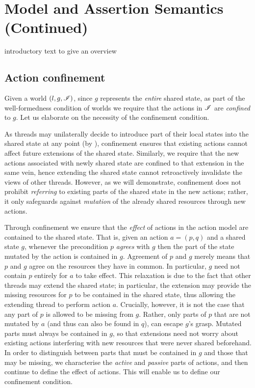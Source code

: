 \section{\colosl Model and Assertion Semantics (Continued)}\label{chapter:logic}
\todo introductory text to give an overview
%
%
\subsection{Action confinement}
Given a world $(l, g, \mathscr{I})$, since $g$ represents the \emph{entire} shared state, as part of the well-formedness condition of worlds we require that the actions in $\mathscr{I}$ are \emph{confined} to $g$.  
Let us elaborate on the necessity of the confinement condition.

As threads may unilaterally decide to introduce part of their local states into the shared state at any point (by \extendRule), confinement ensures that existing actions cannot affect future extensions of the shared state. Similarly, we require that the new actions associated with newly shared state are confined to that extension in the same vein, hence extending the shared state cannot retroactively invalidate the views of other threads. However, as we will demonstrate, confinement does not prohibit \emph{referring} to existing parts of the shared state in the new actions; rather, it only safeguards against \emph{mutation} of the already shared resources through new actions.

Through confinement we ensure that the \emph{effect} of actions in the action model are contained to the shared state. That is, given an action $a = (p,q)$ and a shared state $g$, whenever the precondition $p$ \emph{agrees} with $g$ then the part of the state mutated by the action is contained in $g$. 
Agreement of $p$ and $g$ merely means that $p$ and $g$ agree on the resources they have in common. 
In particular, $g$ need not contain $p$ entirely for $a$ to take effect. This relaxation is due to the fact that other threads may extend the shared state; in particular, the extension may provide the missing resources for $p$ to be contained in the shared state, thus allowing the extending thread to perform action $a$. Crucially, however, it is not the case that any part of $p$ is allowed to be missing from $g$. Rather, only parts of $p$ that are not mutated by $a$ (and thus can also be found in $q$), can escape $g$'s grasp. Mutated parts must always be contained in $g$, so that extensions need not worry about existing actions interfering with new resources that were never shared beforehand. In order to distinguish between parts that must be contained in $g$ and those that may be missing, we characterise the \emph{active} and \emph{passive} parts of actions, and then continue to define the effect of actions. This will enable us to define our confinement condition.

